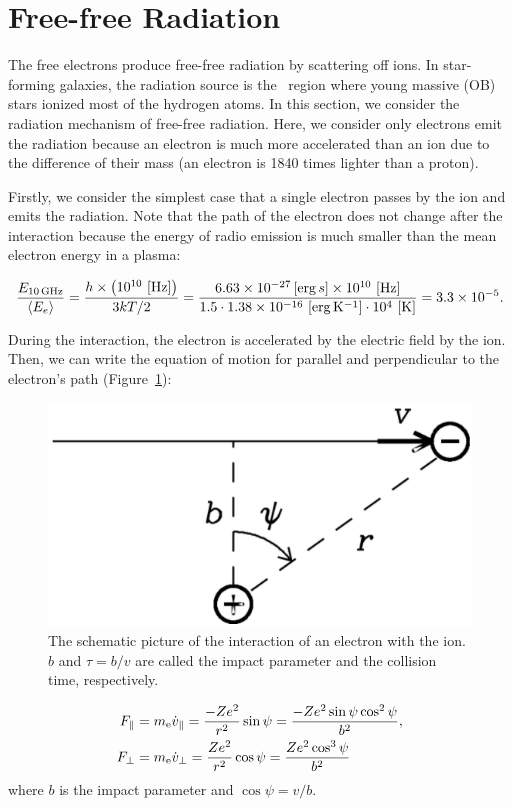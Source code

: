 \section{Free-free Radiation}\label{sec:freefreeradiation}

The free electrons produce free-free radiation by scattering off ions.
In star-forming galaxies, the radiation source is the \ih~region where young massive (OB) stars ionized most of the hydrogen atoms.
In this section, we consider the radiation mechanism of free-free radiation.
Here, we consider only electrons emit the radiation because an electron is much more accelerated than an ion due to the difference of their mass (an electron is 1840 times lighter than a proton).

Firstly, we consider the simplest case that a single electron passes by the ion and emits the radiation.
Note that the path of the electron does not change after the interaction because the energy of radio emission is much smaller than the mean electron energy in a plasma:

\begin{equation}\label{eq:essential_radio4n12}
    \frac{E_{\mathrm{10\,\mathrm{GHz}}}}{\left\langle E_e\right\rangle} = \frac{h \times \left(10^{10}\,\left[\mathrm{Hz}\right]\right)}{3kT / 2} = \frac{6.63 \times 10^{-27} \left[\mathrm{erg}\,s\right] \times 10^{10}\,\left[\mathrm{Hz}\right]}{1.5 \cdot 1.38 \times 10^{-16}\,\left[\mathrm{erg\,K^{-1}}\right] \cdot 10^4\,\left[\mathrm{K}\right]} = 3.3 \times 10^{-5}.
\end{equation}

During the interaction, the electron is accelerated by the electric field by the ion.
Then, we can write the equation of motion for parallel and perpendicular to the electron's path (Figure~\ref{fig:nrao_radio4n2}):

\begin{figure}[htbp]
	\centering
	\includegraphics[width=.6\linewidth]{Chapter_2/Figures/NRAO_radio4n2.png}
    \caption[The schematic image of the interaction of an electron with the ion]{\label{fig:nrao_radio4n2}
        The schematic picture of the interaction of an electron with the ion.
        $b$ and $\tau = b/v$ are called the impact parameter and the collision time, respectively.
    }
\end{figure}
\begin{align}
    F_{\|} &= m_{\mathrm{e}} \dot{v}_{\|}=\frac{-Z e^{2}}{r^{2}} \sin \psi=\frac{-Z e^{2} \sin \psi \cos ^{2} \psi}{b^{2}},\label{eq:essential_radio4n15}\\
    F_{\perp} &= m_{\mathrm{e}} \dot{v}_{\perp}=\frac{Z e^{2}}{r^{2}} \cos \psi=\frac{Z e^{2} \cos ^{3} \psi}{b^{2}}\label{eq:essential_radio4n16}
\end{align}
where $b$ is the impact parameter and $\cos\psi = v/b$.

